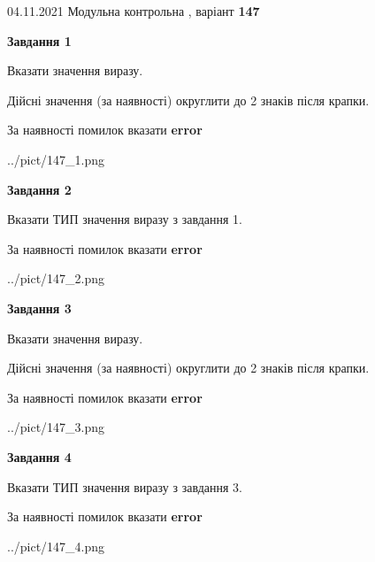 \documentclass[11pt, ukrainian]{article}
\begin{document}
{04.11.2021 Модульна контрольна , варіант  \No \textbf { 147 }\par}
{
\begin {large}
{\begin {center}\textbf{Завдання 1}\end {center}}\par
Вказати значення виразу. \par
Дійсні значення (за наявності) округлити до 2 знаків після крапки. \par
За наявності помилок вказати \textbf{error}

\begin{center}
	{../pict/147_1.png}
\end{center}
\newpage

{\begin {center}\textbf{Завдання 2}\end {center}}\par
Вказати ТИП значення виразу з завдання 1. \par
За наявності помилок вказати \textbf{error}

\begin{center}
	{../pict/147_2.png}
\end{center}
\newpage

{\begin {center}\textbf{Завдання 3}\end {center}}\par
Вказати значення виразу. \par
Дійсні значення (за наявності) округлити до 2 знаків після крапки. \par
За наявності помилок вказати \textbf{error}

\begin{center}
	{../pict/147_3.png}
\end{center}
\newpage

{\begin {center}\textbf{Завдання 4}\end {center}}\par
Вказати ТИП значення виразу з завдання 3. \par
За наявності помилок вказати \textbf{error}

\begin{center}
	{../pict/147_4.png}
\end{center}
\newpage


\end{large}}
\end{document}
